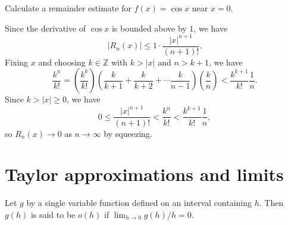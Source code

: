 \documentclass[letter-paper]{tufte-book}
\newenvironment{example}[1][Example]{\begin{trivlist}
\item[\hskip \labelsep {\bfseries #1}]}{\end{trivlist}}
\begin{document}
\begin{example}
  Calculate a remainder estimate for $f(x)=\cos x$ near $x=0$.
  
  Since the derivative of $\cos x$ is bounded above by $1$, we have
  \begin{equation*}
    |R_n(x)|\leq 1\cdot\frac{|x|^{n+1}}{(n+1)!}.
  \end{equation*}
  Fixing $x$ and choosing $k\in\mathbb{Z}$ with $k>|x|$ and $n>k+1$, we have
  \begin{equation*}
    \frac{k^n}{k!}=\left(\frac{k^k}{k!}\right)
    \left(\frac{k}{k+1}+\frac{k}{k+2}+\cdots\frac{k}{n-1}\right)
    \left(\frac{k}{n}\right)<\frac{k^{k+1}}{k!}\frac{1}{n}.
  \end{equation*}
  Since $k>|x|\geq0$, we have
  \begin{equation*}
    0\leq\frac{|x|^{n+1}}{(n+1)!}<\frac{k^n}{k!}<\frac{k^{k+1}}{k!}\frac{1}{n},
  \end{equation*}
  so $R_n(x)\to 0$ as $n\to\infty$ by squeezing.
\end{example}


\section{Taylor approximations and limits}

Let $g$ by a single variable function defined on an interval containing $h$.
Then $g(h)$ is said to be $o(h)$ if $\lim_{h\to 0} g(h)/h=0$.
\end{document}
